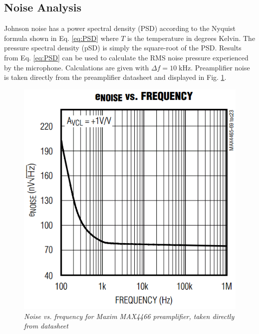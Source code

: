 \documentclass[journal]{IEEEtran}
\begin{document}
\subsection{Noise Analysis}

Johnson noise has a power spectral density (PSD) according to the Nyquist formula shown in Eq. \ref{eq:PSD} where $T$ is the temperature in degrees Kelvin. The pressure spectral density (pSD) is simply the square-root of the PSD. Results from Eq. \ref{eq:PSD} can be used to calculate the RMS noise pressure experienced by the microphone. Calculations are given with $\Delta f = 10 \; \mathrm{kHz}$. Preamplifier noise is taken directly from the preamplifier datasheet and displayed in Fig. \ref{fig:PreampNoise}.

\begin{figure}[ht]
	\centering
	\includegraphics[scale=0.4]{PreampNoise.png}
	\caption{\em Noise vs. frequency for Maxim MAX4466 preamplifier, taken directly from datasheet\supercite{amp}}
	\label{fig:PreampNoise}
\end{figure}

\clearpage
\printbibliography
\end{document}
